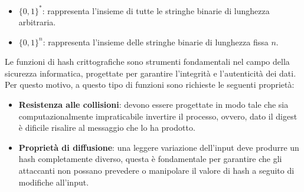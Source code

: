 \begin{itemize}
    \item $\{0,1\}^*$: rappresenta l'insieme di tutte le stringhe binarie di lunghezza arbitraria.
    \item $\{0,1\}^n$: rappresenta l'insieme delle stringhe binarie di lunghezza fissa $n$.
\end{itemize}

\vspace{0.2cm}
\noindent
Le funzioni di hash crittografiche sono strumenti fondamentali nel campo della
sicurezza informatica, progettate per garantire l'integrità e l'autenticità dei
dati. Per questo motivo, a questo tipo di funzioni sono richieste le seguenti proprietà: 
\begin{itemize}
    \item \textbf{Resistenza alle collisioni}: devono essere progettate in modo tale che sia \\computazionalmente impraticabile invertire il processo, ovvero,  dato il digest è dificile risalire 
    al messaggio che lo ha prodotto.
    \item \textbf{Proprietà di diffusione}: una leggere variazione dell'input deve produrre un hash completamente diverso, questa è fondamentale per garantire che gli attaccanti non possano prevedere o
    manipolare il valore di hash a seguito di modifiche all'input.
\end{itemize}    

